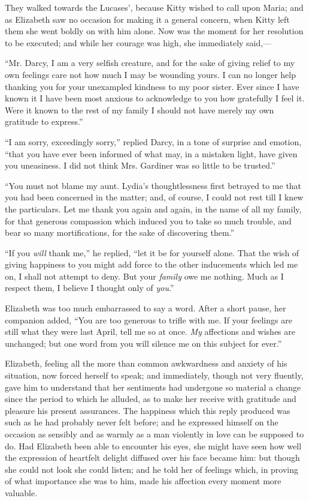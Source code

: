 They walked towards the Lucases', because Kitty wished to call upon Maria; and as Elizabeth saw no occasion for making it a general concern, when Kitty left them she went boldly on with him alone. Now was the moment for her resolution to be executed; and while her courage was high, she immediately said,---

``Mr. Darcy, I am a very selfish creature, and for the sake of giving relief to my own feelings care not how much I may be wounding yours. I can no longer help thanking you for your unexampled kindness to my poor sister. Ever since I have known it I have been most anxious to acknowledge to you how gratefully I feel it. Were it known to the rest of my family I should not have merely my own gratitude to express.''

``I am sorry, exceedingly sorry,'' replied Darcy, in a tone of surprise and emotion, ``that you have ever been informed of what may, in a mistaken light, have given you uneasiness. I did not think Mrs. Gardiner was so little to be trusted.''

``You must not blame my aunt. Lydia's thoughtlessness first betrayed to me that you had been concerned in the matter; and, of course, I could not rest till I knew the particulars. Let me thank you again and again, in the name of all my family, for that generous compassion which induced you to take so much trouble, and bear so many mortifications, for the sake of discovering them.''

``If you \textit{will} thank me,'' he replied, ``let it be for yourself alone. That the wish of giving happiness to you might add force to the other inducements which led me on, I shall not attempt to deny. But your \textit{family} owe me nothing. Much as I respect them, I believe I thought only of \textit{you}.''

Elizabeth was too much embarrassed to say a word. After a short pause, her companion added, ``You are too generous to trifle with me. If your feelings are still what they were last April, tell me so at once. \textit{My} affections and wishes are unchanged; but one word from you will silence me on this subject for ever.''

Elizabeth, feeling all the more than common awkwardness and anxiety of his situation, now forced herself to speak; and immediately, though not very fluently, gave him to understand that her sentiments had undergone so material a change since the period to which he alluded, as to make her receive with gratitude and pleasure his present assurances. The happiness which this reply produced was such as he had probably never felt before; and he expressed himself on the occasion as sensibly and as warmly as a man violently in love can be supposed to do. Had Elizabeth been able to encounter his eyes, she might have seen how well the expression of heartfelt delight diffused over his face became him: but though she could not look she could listen; and he told her of feelings which, in proving of what importance she was to him, made his affection every moment more valuable.

